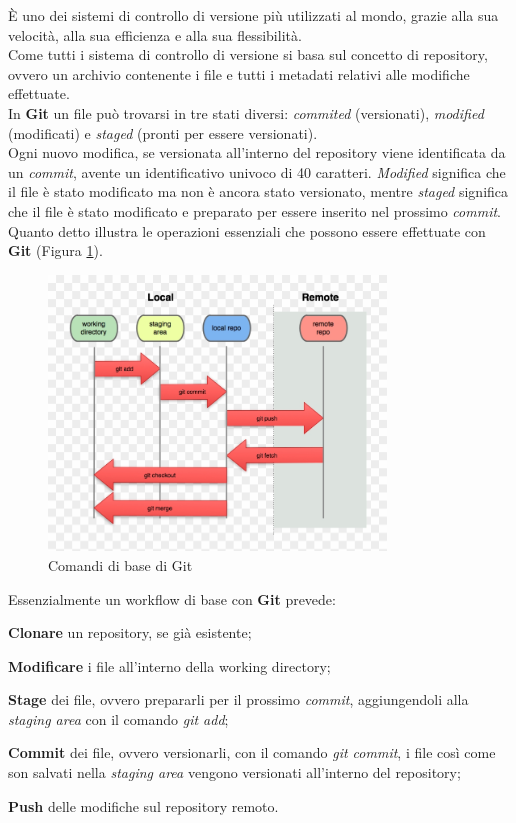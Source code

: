\noindent È uno dei sistemi di controllo di versione più utilizzati al mondo, grazie alla sua velocità, alla sua efficienza e alla sua flessibilità.\\
Come tutti i sistema di controllo di versione si basa sul concetto di \gls{repository}{}, ovvero un archivio contenente i file e tutti i 
\gls{metadati}{} relativi alle modifiche effettuate.\\  
In \textbf{Git} un file può trovarsi in tre stati diversi: \textit{commited} (versionati), \textit{modified} (modificati) e \textit{staged} (pronti per essere versionati).\\
Ogni nuovo modifica, se versionata all'interno del \gls{repository} viene identificata da un \textit{commit}, avente un identificativo univoco di 40 caratteri. \textit{Modified} 
significa che il file è stato modificato ma non è ancora stato versionato, mentre \textit{staged} significa che il file è stato modificato e preparato per essere inserito nel 
prossimo \textit{commit}.\\
Quanto detto illustra le operazioni essenziali che possono essere effettuate con \textbf{Git} (Figura \ref{fig:git_workflow}).
\begin{figure}[h]
    \centering
    \includegraphics[width=0.8\textwidth]{images/tecnologie/comandi_git.png}
    \caption{Comandi di base di Git}
    \label{fig:git_workflow}
\end{figure}
Essenzialmente un workflow di base con \textbf{Git} prevede:
\begin{list}{-}{}
    \item \textbf{Clonare} un \gls{repository}{}, se già esistente;
    \item \textbf{Modificare} i file all'interno della \gls{working directory}{};
    \item \textbf{Stage} dei file, ovvero prepararli per il prossimo \textit{commit}, aggiungendoli alla \textit{staging area} con il comando \textit{git add};
    \item \textbf{Commit} dei file, ovvero versionarli, con il comando \textit{git commit}, i file così come son salvati nella \textit{staging area} vengono versionati all'interno del \gls{repository}{};
    \item \textbf{Push} delle modifiche sul \gls{repository}{} remoto.
\end{list}
